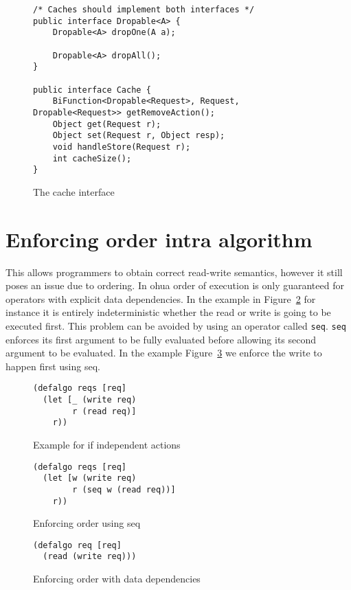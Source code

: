 \begin{figure}
\begin{verbatim}
/* Caches should implement both interfaces */
public interface Dropable<A> {
    Dropable<A> dropOne(A a);

    Dropable<A> dropAll();
}

public interface Cache {
    BiFunction<Dropable<Request>, Request, Dropable<Request>> getRemoveAction();
    Object get(Request r);
    Object set(Request r, Object resp);
    void handleStore(Request r);
    int cacheSize();
}
\end{verbatim}
\caption{The cache interface}
\label{fig:the-cache-interface}
\end{figure}

\section{Enforcing order intra algorithm}

This allows programmers to obtain correct read-write semantics, however it still poses an issue due to ordering.
In ohua order of execution is only guaranteed for operators with explicit data dependencies.
In the example in Figure~\ref{fig:independent-actions-code} for instance it is entirely indeterministic whether the read or write is going to be executed first.
This problem can be avoided by using an operator called \texttt{seq}.
\texttt{seq} enforces its first argument to be fully evaluated before allowing its second argument to be evaluated.
In the example Figure~\ref{fig:enforcing-order-with-seq} we enforce the write to happen first using seq.

\begin{figure}
\begin{verbatim}
(defalgo reqs [req]
  (let [_ (write req)
        r (read req)]
    r))
\end{verbatim}
\caption{Example for if independent actions}
\label{fig:independent-actions-code}
\end{figure}

\begin{figure}
\begin{verbatim}
(defalgo reqs [req]
  (let [w (write req)
        r (seq w (read req))]
    r))
\end{verbatim}
\caption{Enforcing order using seq}
\label{fig:enforcing-order-with-seq}
\end{figure}

\begin{figure}
\begin{verbatim}
(defalgo req [req]
  (read (write req)))
\end{verbatim}
\caption{Enforcing order with data dependencies}
\label{fig:enforcing-order-with-dd}
\end{figure}


